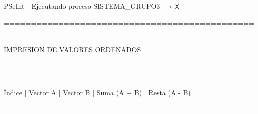 \documentclass[12pt,a4paper]{article}
\newcommand{\consola}[1]{\noindent\textcolor{pseString}{#1}}
\newenvironment{PSeIntWindow}{%
	\begin{tcolorbox}[
		breakable,
		enhanced,
		colback=white,
		colframe=black!60,
		boxrule=0.5pt,
		arc=1mm,
		left=0mm,
		right=0mm,
		top=0mm,
		bottom=2mm,
		width=\textwidth
		]
	}{%
	\end{tcolorbox}
}
\newcommand{\BarraPSeInt}{%
	\colorbox{gray!20}{%
		\parbox{\dimexpr\textwidth-2\fboxsep\relax}{%
			\small
			\textcolor{pseString}{\faPlayCircle}
			\hspace{0.3em}
			PSeInt - Ejecutando proceso SISTEMA\_GRUPO3
			\hfill
			\texttt{\_ \hspace{0.5em} \(\square\) \hspace{0.5em} X}
		}
	}
}
\begin{document}
	\begin{PSeIntWindow}
		
		\BarraPSeInt
		
		\vspace{0.2cm}
		
		\ttfamily\small
		
		\consola{========================================================}\par
		
		\begin{center}
			\textcolor{pseString}{IMPRESION DE VALORES ORDENADOS}
		\end{center}
		
		\consola{========================================================}\par
		
		\vspace{0.25cm}
		
		\consola{Índice \hspace{0.4cm}| \hspace{0.4cm} Vector A \hspace{0.4cm}| \hspace{0.4cm} Vector B \hspace{0.4cm}| \hspace{0.4cm} Suma (A + B) \hspace{0.4cm}| \hspace{0.4cm} Resta (A - B)}\par
		\consola{----------------------------------------------------------------}\par
		

\end{PSeIntWindow}
\end{document}
